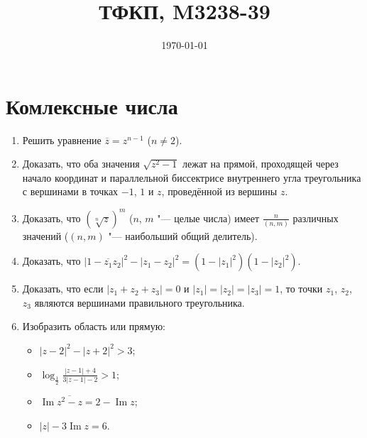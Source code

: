 \documentclass{article}
\title{ТФКП, M3238-39}
\date{\today}
\providecommand{\abs}[1]{\left\lvert#1\right\rvert}
\newcommand{\theIm}{\operatorname{Im}}
\newcommand{\conj}[1]{\overline{#1}}
\begin{document}
\maketitle

\section{Комлексные числа}

\begin{enumerate}
    \item Решить уравнение $\conj{z} = z^{n-1}$ ($n \neq 2$).
    \item Доказать, что оба значения $\sqrt{z^2-1}$ лежат на прямой, проходящей через начало координат и параллельной биссектрисе внутреннего угла треугольника с вершинами в точках $-1$, $1$ и $z$, проведённой из вершины $z$.
    \item Доказать, что $(\sqrt[n]{z})^m$ ($n$, $m$ "--- целые числа) имеет $\frac{n}{(n, m)}$ различных значений ($(n, m)$ "--- наибольший общий делитель).
    \item Доказать, что $\abs{1 - \conj{z_1} z_2}^2 - \abs{z_1 - z_2}^2 = (1 - \abs{z_1}^2)(1 - \abs{z_2}^2)$.
    \item Доказать, что если $\abs{z_1 + z_2 + z_3} = 0$ и $\abs{z_1} = \abs{z_2} = \abs{z_3} = 1$, то точки $z_1$, $z_2$, $z_3$ являются вершинами правильного треугольника.
    \item Изобразить область или прямую: 
        \begin{itemize}
            \everymath{\displaystyle} %
            \item $\abs{z-2}^2 - \abs{z+2}^2 > 3$;
            \item $\log_{\frac{1}{2}} \frac{\abs{z - 1} + 4}{3 \abs{z - 1} - 2} > 1$;
            \item $\theIm \conj{z^2-z} = 2 - \theIm z$;
            \item $\abs{z} - 3 \theIm z = 6$.
            \everymath{\textstyle}
        \end{itemize}
\end{enumerate}
\end{document}
